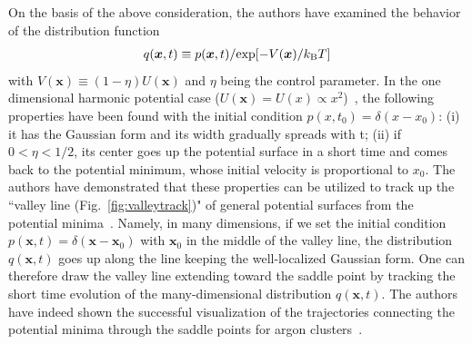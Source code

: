 \documentclass[preprint,12pt]{elsarticle}
\begin{document}
On the basis of the above consideration, the authors have examined the behavior of the distribution function
\begin{eqnarray}
q({\bm x}, t) \equiv p({\bm x}, t)/{\rm exp}[-V({\bm x})/k_{\rm B}T]
\end{eqnarray}
with $V({\bm x})\equiv (1-\eta)U({\bm x})$ and $\eta$ being the control parameter. In the one dimensional harmonic potential case ($U({\bm x})=U(x)\propto x^2$)~\cite{Akashi}, the following properties have been found with the initial condition $p(x, t_{0})=\delta(x-x_{0})$: 
(i) it has the Gaussian form and its width gradually spreads with t; 
(ii) if $0< \eta < 1/2$, its center goes up the potential surface in a short time and comes back to the potential minimum, whose initial velocity is proportional to $x_{0}$. The authors have demonstrated that these properties can be utilized to track up the ``valley line (Fig.~\ref{fig:valleytrack})" of general potential surfaces from the potential minima~\cite{Akashi, Nagornov}. Namely, in many dimensions, if we set the initial condition $p({\bm x}, t)=\delta({\bm x}-{\bm x}_{0})$ with ${\bm x}_{0}$ in the middle of the valley line, the distribution $q({\bm x}, t)$ goes up along the line keeping the well-localized Gaussian form. One can therefore draw the valley line extending toward the saddle point by tracking the short time evolution of the many-dimensional distribution $q({\bm x}, t)$. The authors have indeed shown the successful visualization of the trajectories connecting the potential minima through the saddle points for argon clusters~\cite{Nagornov}. 
\end{document}
